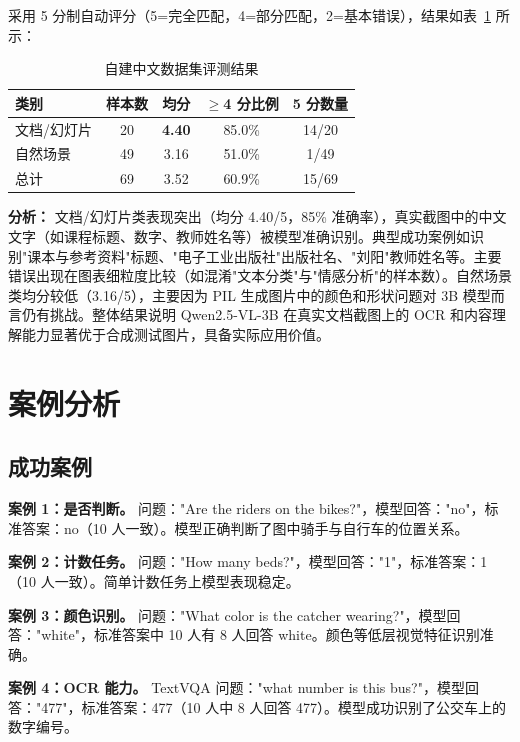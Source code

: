 \documentclass{SYSUReport}
\begin{document}
采用 5 分制自动评分（5=完全匹配，4=部分匹配，2=基本错误），结果如表~\ref{tab:custom_result} 所示：

\begin{table}[H]
    \centering
    \caption{自建中文数据集评测结果}
    \label{tab:custom_result}
    \begin{tabular}{lcccc}
        \toprule
        类别 & 样本数 & 均分 & $\geq$4 分比例 & 5 分数量 \\
        \midrule
        文档/幻灯片 & 20 & \textbf{4.40} & 85.0\% & 14/20 \\
        自然场景 & 49 & 3.16 & 51.0\% & 1/49 \\
        \midrule
        总计 & 69 & 3.52 & 60.9\% & 15/69 \\
        \bottomrule
    \end{tabular}
\end{table}

\textbf{分析：} 文档/幻灯片类表现突出（均分 4.40/5，85\% 准确率），真实截图中的中文文字（如课程标题、数字、教师姓名等）被模型准确识别。典型成功案例如识别"课本与参考资料"标题、"电子工业出版社"出版社名、"刘阳"教师姓名等。主要错误出现在图表细粒度比较（如混淆"文本分类"与"情感分析"的样本数）。自然场景类均分较低（3.16/5），主要因为 PIL 生成图片中的颜色和形状问题对 3B 模型而言仍有挑战。整体结果说明 Qwen2.5-VL-3B 在真实文档截图上的 OCR 和内容理解能力显著优于合成测试图片，具备实际应用价值。

\section{案例分析}

\subsection{成功案例}

\textbf{案例 1：是否判断。} 问题："Are the riders on the bikes?"，模型回答："no"，标准答案：no（10 人一致）。模型正确判断了图中骑手与自行车的位置关系。

\textbf{案例 2：计数任务。} 问题："How many beds?"，模型回答："1"，标准答案：1（10 人一致）。简单计数任务上模型表现稳定。

\textbf{案例 3：颜色识别。} 问题："What color is the catcher wearing?"，模型回答："white"，标准答案中 10 人有 8 人回答 white。颜色等低层视觉特征识别准确。

\textbf{案例 4：OCR 能力。} TextVQA 问题："what number is this bus?"，模型回答："477"，标准答案：477（10 人中 8 人回答 477）。模型成功识别了公交车上的数字编号。
\end{document}

